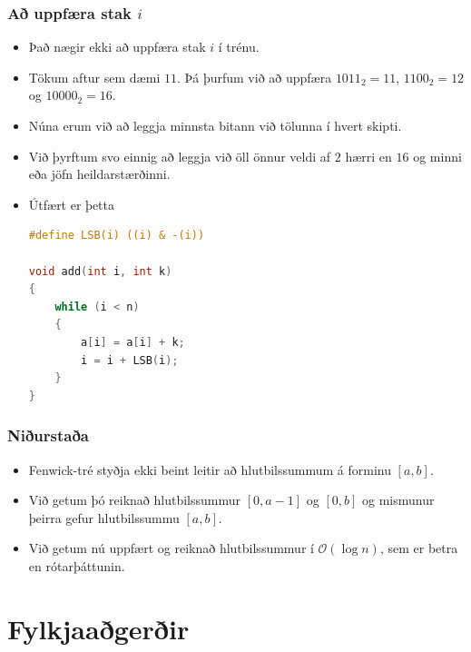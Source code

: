 \documentclass{beamer}
\renewcommand\O{\mathcal{O}}
\begin{document}
\begin{frame}[fragile]
	\frametitle{Að uppfæra stak $i$}
	\begin{itemize}
		\item<1-> Það nægir ekki að uppfæra stak $i$ í trénu.
		\item<2-> Tökum aftur sem dæmi $11$. Þá þurfum við að uppfæra $1011_2 = 11$, $1100_2 = 12$ og $10000_2 = 16$.
		\item<3-> Núna erum við að leggja minnsta bitann við tölunna í hvert skipti.
		\item<4-> Við þyrftum svo einnig að leggja við öll önnur veldi af $2$ hærri en $16$ og minni eða jöfn heildarstærðinni.
		\item<5-> Útfært er þetta
		\tiny
		\begin{lstlisting}[language=C]
#define LSB(i) ((i) & -(i))

void add(int i, int k)
{
	while (i < n) 
	{
		a[i] = a[i] + k;
		i = i + LSB(i);
	}
}
		\end{lstlisting}
	\end{itemize}
\end{frame}

\begin{frame}
	\frametitle{Niðurstaða}
	\begin{itemize}
		\item<1-> Fenwick-tré styðja ekki beint leitir að hlutbilssummum á forminu $[a, b]$.
		\item<2-> Við getum þó reiknað hlutbilssummur $[0, a - 1]$ og $[0, b]$ og mismunur þeirra gefur hlutbilssummu $[a, b]$.
		\item<3-> Við getum nú uppfært og reiknað hlutbilssummur í $\O(\log n)$, sem er betra en rótarþáttunin.
	\end{itemize}
\end{frame}

\section[Fylkjaaðgerðir]{Fylkjaaðgerðir}
\end{document}

